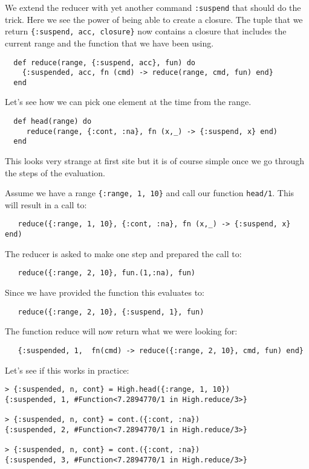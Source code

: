 \documentclass[a4paper,11pt]{article}
\begin{document}
We extend the reducer with yet another command {\tt :suspend} that
should do the trick. Here we see the power of being able to create a
closure. The tuple that we return {\tt \{:suspend, acc, closure\}} now
contains a closure that includes the current range and the function
that we have been using.

\begin{verbatim}
  def reduce(range, {:suspend, acc}, fun) do
    {:suspended, acc, fn (cmd) -> reduce(range, cmd, fun) end}
  end
\end{verbatim}

\noindent Let's see how we can pick one element at the time from the range.

\begin{verbatim}
  def head(range) do
     reduce(range, {:cont, :na}, fn (x,_) -> {:suspend, x} end)
  end
\end{verbatim}

\noindent This looks very strange at first site but it is of course simple once
we go through the steps of the evaluation.

\noindent Assume we have a range {\tt \{:range, 1, 10\}} and call our function
{\tt head/1}. This will result in a call to:

\begin{verbatim}
   reduce({:range, 1, 10}, {:cont, :na}, fn (x,_) -> {:suspend, x} end)
\end{verbatim}

\noindent The reducer is asked to make one step and prepared the call to:

\begin{verbatim}
   reduce({:range, 2, 10}, fun.(1,:na), fun)
\end{verbatim}

\noindent Since we have provided the function this evaluates to:

\begin{verbatim}
   reduce({:range, 2, 10}, {:suspend, 1}, fun)
\end{verbatim}
 
\noindent The function reduce will now return what we were looking for:

\begin{verbatim}
   {:suspended, 1,  fn(cmd) -> reduce({:range, 2, 10}, cmd, fun) end}
\end{verbatim}

\noindent Let's see if this works in practice:

\begin{verbatim}
> {:suspended, n, cont} = High.head({:range, 1, 10})
{:suspended, 1, #Function<7.2894770/1 in High.reduce/3>}

> {:suspended, n, cont} = cont.({:cont, :na})
{:suspended, 2, #Function<7.2894770/1 in High.reduce/3>}

> {:suspended, n, cont} = cont.({:cont, :na})
{:suspended, 3, #Function<7.2894770/1 in High.reduce/3>}
\end{verbatim}
\end{document}
